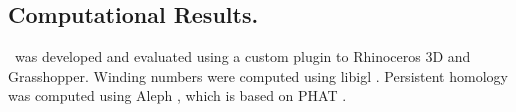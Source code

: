 \subsection{Computational Results.}





\briancode\ was developed and evaluated using a custom plugin to Rhinoceros 3D and Grasshopper.
Winding numbers were computed using libigl \cite{jacobson2013libigl}.
Persistent homology was computed using Aleph \cite{aleph}, which is based on PHAT \cite{Bauer:2017}.

